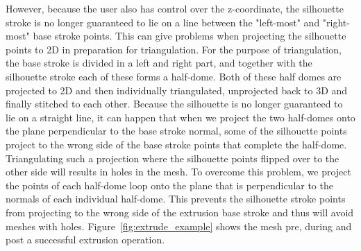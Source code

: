 However, because the user also has control over the z-coordinate, the silhouette stroke is no longer guaranteed to lie on a line between the "left-most" and "right-most" base stroke points. This can give problems when projecting the silhouette points to 2D in preparation for triangulation. For the purpose of triangulation, the base stroke is divided in a left and right part, and together with the silhouette stroke each of these forms a half-dome. Both of these half domes are projected to 2D and then individually triangulated, unprojected back to 3D and finally stitched to each other. Because the silhouette is no longer guaranteed to lie on a straight line, it can happen that when we project the two half-domes onto the plane perpendicular to the base stroke normal, some of the silhouette points project to the wrong side of the base stroke points that complete the half-dome. Triangulating such a projection where the silhouette points flipped over to the other side will results in holes in the mesh. To overcome this problem, we project the points of each half-dome loop onto the plane that is perpendicular to the normals of each individual half-dome. This prevents the silhouette stroke points from projecting to the wrong side of the extrusion base stroke and thus will avoid meshes with holes. Figure~\ref{fig:extrude_example} shows the mesh pre, during and post a successful extrusion operation.

